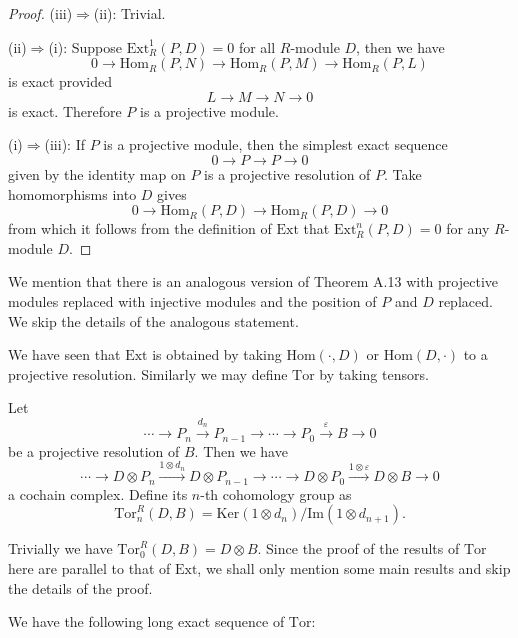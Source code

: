 \begin{proof}
(iii)$\Rightarrow$(ii): Trivial.\par
(ii)$\Rightarrow$(i): Suppose $\mathrm{Ext}_R^1(P,D)=0$ for all $R$-module $D$, then we have 
$$
0\longrightarrow \mathrm{Hom}_R\left( P,N \right) \longrightarrow \mathrm{Hom}_R\left( P,M \right) \longrightarrow \mathrm{Hom}_R\left( P,L \right) 
$$
is exact provided 
$$
L\longrightarrow M\longrightarrow N\longrightarrow 0
$$
is exact. Therefore $P$ is a projective module.\par
(i)$\Rightarrow$(iii): If $P$ is a projective module, then the simplest exact sequence 
$$
0\longrightarrow P\longrightarrow P\longrightarrow 0
$$
given by the identity map on $P$ is a projective resolution of $P$. Take homomorphisms into $D$ gives 
$$
0\longrightarrow \mathrm{Hom}_R\left( P,D \right) \longrightarrow \mathrm{Hom}_R\left( P,D \right) \longrightarrow 0
$$
from which it follows from the definition of $\mathrm{Ext}$ that $\mathrm{Ext}_R^n(P,D)=0$ for any $R$-module $D$.
\end{proof}
We mention that there is  an analogous version of Theorem A.13 with projective modules replaced with injective modules and the position of $P$ and $D$ replaced. We skip the details of the analogous statement.\par
We have seen that $\mathrm{Ext}$ is obtained by taking $\mathrm{Hom}(\cdot,D)$ or $\mathrm{Hom}(D,\cdot)$ to a projective resolution. Similarly we may define $\mathrm{Tor}$ by taking tensors.
\begin{definition}
Let 
$$
\cdots \longrightarrow P_n\overset{d_n}{\longrightarrow}P_{n-1}\longrightarrow \cdots \longrightarrow P_0\overset{\varepsilon}{\longrightarrow}B\longrightarrow 0
$$
be a projective resolution of $B$. Then we have 
$$
\cdots \longrightarrow D\otimes P_n\overset{1\otimes d_n}{\longrightarrow}D\otimes P_{n-1}\longrightarrow \cdots \longrightarrow D\otimes P_0\overset{1\otimes \varepsilon}{\longrightarrow}D\otimes B\longrightarrow 0
$$
a cochain complex. Define its $n$-th cohomology group as 
$$
\mathrm{Tor}_{n}^{R}\left( D,B \right) =\mathrm{Ker}\left( 1\otimes d_n \right) /\mathrm{Im}\left( 1\otimes d_{n+1} \right) .
$$
\end{definition}
Trivially we have $\mathrm{Tor}_0^R(D,B)=D\otimes B$. Since the proof of the results of $\mathrm{Tor}$ here are parallel to that of $\mathrm{Ext}$, we shall only mention some main results and skip the details of the proof.\par
We have the following long exact sequence of $\mathrm{Tor}$:
